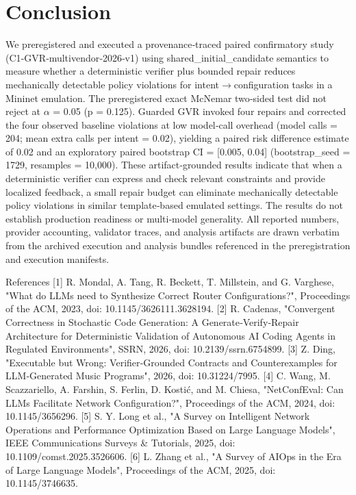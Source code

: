\documentclass[conference]{IEEEtran}
\begin{document}
\section{Conclusion}
We preregistered and executed a provenance‑traced paired confirmatory study (C1‑GVR‑multivendor‑2026‑v1) using shared\_initial\_candidate semantics to measure whether a deterministic verifier plus bounded repair reduces mechanically detectable policy violations for intent\ensuremath{\rightarrow}configuration tasks in a Mininet emulation. The preregistered exact McNemar two‑sided test did not reject at \ensuremath{\alpha} = 0.05 (p = 0.125). Guarded GVR invoked four repairs and corrected the four observed baseline violations at low model‑call overhead (model calls = 204; mean extra calls per intent = 0.02), yielding a paired risk difference estimate of 0.02 and an exploratory paired bootstrap CI = [0.005, 0.04] (bootstrap\_seed = 1729, resamples = 10,000). These artifact‑grounded results indicate that when a deterministic verifier can express and check relevant constraints and provide localized feedback, a small repair budget can eliminate mechanically detectable policy violations in similar template‑based emulated settings. The results do not establish production readiness or multi‑model generality. All reported numbers, provider accounting, validator traces, and analysis artifacts are drawn verbatim from the archived execution and analysis bundles referenced in the preregistration and execution manifests.

References
[1] R. Mondal, A. Tang, R. Beckett, T. Millstein, and G. Varghese, "What do LLMs need to Synthesize Correct Router Configurations?", Proceedings of the ACM, 2023, doi: 10.1145/3626111.3628194.
[2] R. Cadenas, "Convergent Correctness in Stochastic Code Generation: A Generate‑Verify‑Repair Architecture for Deterministic Validation of Autonomous AI Coding Agents in Regulated Environments", SSRN, 2026, doi: 10.2139/ssrn.6754899.
[3] Z. Ding, "Executable but Wrong: Verifier‑Grounded Contracts and Counterexamples for LLM‑Generated Music Programs", 2026, doi: 10.31224/7995.
[4] C. Wang, M. Scazzariello, A. Farshin, S. Ferlin, D. Kostić, and M. Chiesa, "NetConfEval: Can LLMs Facilitate Network Configuration?", Proceedings of the ACM, 2024, doi: 10.1145/3656296.
[5] S. Y. Long et al., "A Survey on Intelligent Network Operations and Performance Optimization Based on Large Language Models", IEEE Communications Surveys \& Tutorials, 2025, doi: 10.1109/comst.2025.3526606.
[6] L. Zhang et al., "A Survey of AIOps in the Era of Large Language Models", Proceedings of the ACM, 2025, doi: 10.1145/3746635.
\end{document}
